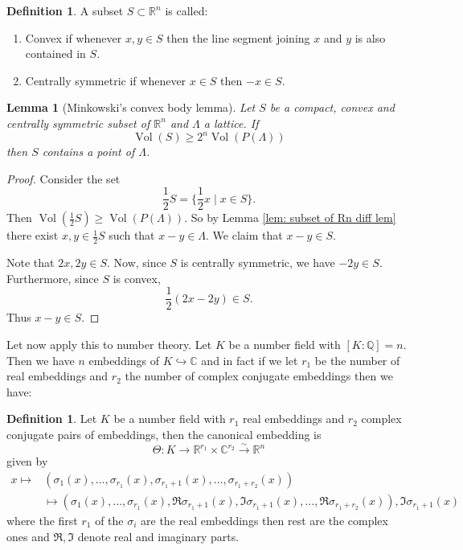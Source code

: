 \documentclass[11pt,a4paper]{report}
\theoremstyle{plain}
\newtheorem{lem}[subsection]{Lemma}
\theoremstyle{definition}
\newtheorem{definition}[subsection]{Definition}
\theoremstyle{definition}
\newcommand{\RR}{\mathbb{R}}
\def\CC{\mathbb{C}}
\def\QQ{\mathbb{Q}}
\def \s {\sigma}
\def \s {\sigma}
\DeclareMathOperator{\Vol}{Vol}
\def \lra{\longrightarrow}
\begin{document}
	\begin{definition}
		A subset $S \subset \RR^n$ is called:
		\begin{enumerate}
			\item Convex if whenever $x,y \in S$ then the line segment joining $x$ and $y$ is also contained in $S$.
			\item Centrally symmetric if whenever $x \in S$ then $-x \in S$.
		\end{enumerate}
	\end{definition}
	
	\begin{lem}[Minkowski's convex body lemma]\label{lem: mink conv bod}
		Let $S$ be a compact, convex and centrally symmetric subset of $\RR^n$ and $\Lambda$ a lattice. If \[\Vol(S) \geq 2^n \Vol(P(\Lambda))\] then $S$ contains a point of $\Lambda$. 
	\end{lem}
	
	\begin{proof}
		Consider the set \[\frac{1}{2}S=\{\frac{1}{2} x \mid x \in S\}.\] Then $\Vol(\frac{1}{2}S) \geq \Vol(P(\Lambda))$. So by Lemma \ref{lem: subset of Rn diff lem} there exist $x,y \in \frac{1}{2}S$ such that $x-y \in \Lambda$. We claim that $x-y \in S$. 
		
		Note that $2x,2y \in S$. Now, since $S$ is centrally symmetric, we have $-2y \in S$. Furthermore, since $S$ is convex, \[\frac{1}{2} (2x-2y) \in S.\] Thus $x-y \in S$.
	\end{proof}
	
	Let now apply this to number theory. Let $K$ be a number field with $[K:\QQ]=n$. Then we have $n$ embeddings of $K \hookrightarrow \CC$ and in fact if we let $r_1$ be the number of real embeddings and $r_2$ the number of complex conjugate embeddings then we have:
	
	\begin{definition}
		Let $K$ be a number field with $r_1$ real embeddings and $r_2$ complex conjugate pairs of embeddings, then the canonical embedding is \[\Theta: K \lra \RR^{r_1} \times \CC^{r_2} \overset{\sim}{\lra} \RR^n\] given by \begin{align*}
			x \mapsto& (\s_1(x),\dots,\s_{r_1}(x),\s_{r_1+1}(x),\dots,\s_{r_1+r_2}(x))\\ &\mapsto (\s_1(x),\dots,\s_{r_1}(x),\Re \s_{r_1+1}(x),\Im\s_{r_1+1}(x), \dots,\Re \s_{r_1+r_2}(x)), \Im \s_{r_1+1}(x) 
		\end{align*} where the first $r_1$ of the $\s_i$ are the real embeddings then rest are the complex ones and $\Re,\Im$ denote real and imaginary parts.
	\end{definition}
	
\end{document}
